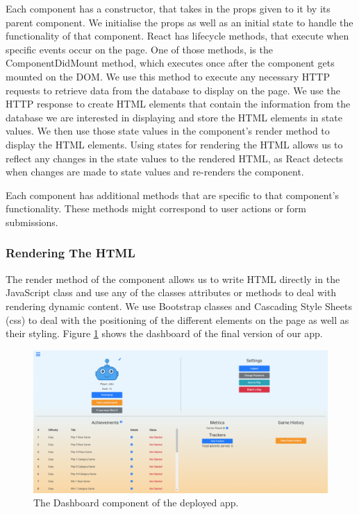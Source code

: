 \documentclass{l4proj}
\begin{document}
Each component has a constructor, that takes in the props given to it by its parent component. We initialise the props as well as an initial state to handle the functionality of that component. React has lifecycle methods, that execute when specific events occur on the page. One of those methods, is the ComponentDidMount method, which executes once after the component gets mounted on the DOM. We use this method to execute any necessary HTTP requests to retrieve data from the database to display on the page. We use the HTTP response to create HTML elements that contain the information from the database we are interested in displaying and store the HTML elements in state values. We then use those state values in the component's render method to display the  HTML elements. Using states for rendering the HTML allows us to reflect any changes in the state values to the rendered HTML, as React detects when changes are made to state values and re-renders the component.

Each component has additional methods that are specific to that component's functionality. These methods might correspond to user actions or form submissions.

\subsubsection{Rendering The HTML}
The render method of the component allows us to write HTML directly in the JavaScript class and use any of the classes attributes or methods to deal with rendering dynamic content. We use Bootstrap classes and Cascading Style Sheets (css) to deal with the positioning of the different elements on the page as well as their styling. Figure \ref{fig:dash_deploy} shows the dashboard of the final version of our app. 

\begin{figure}
    \centering
    \includegraphics[width=1\linewidth]{images/dash_deploy.png}    

    \caption{The Dashboard component of the deployed app.}

    \label{fig:dash_deploy} 
\end{figure}
\end{document}
